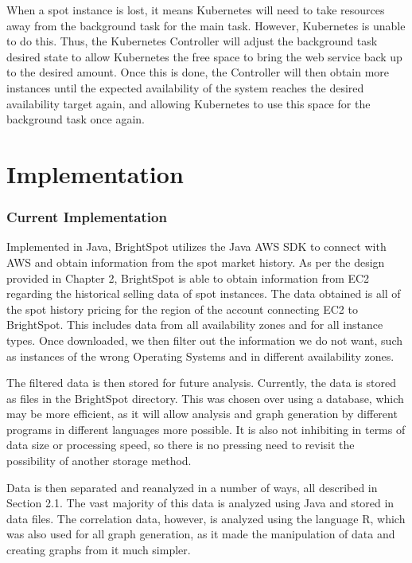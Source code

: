 \documentclass[thesis,proposal]{umassthesis}  %
\begin{document}
When a spot instance is lost, it means Kubernetes will need to take resources away from the background task for the main task. However, Kubernetes is unable to do this. Thus, the Kubernetes Controller will adjust the background task desired state to allow Kubernetes the free space to bring the web service back up to the desired amount. Once this is done, the Controller will then obtain more instances until the expected availability of the system reaches the desired availability target again, and allowing Kubernetes to use this space for the background task once again.








\chapter{Implementation}


\subsection{Current Implementation}
Implemented in Java, BrightSpot utilizes the Java AWS SDK to connect with AWS and obtain information from the spot market history. As per the design provided in Chapter 2, BrightSpot is able to obtain information from EC2 regarding the historical selling data of spot instances. The data obtained is all of the spot history pricing for the region of the account connecting EC2 to BrightSpot. This includes data from all availability zones and for all instance types. Once downloaded, we then filter out the information we do not want, such as instances of the wrong Operating Systems and in different availability zones.\par

The filtered data is then stored for future analysis. Currently, the data is stored as files in the BrightSpot directory. This was chosen over using a database, which may be more efficient, as it will allow analysis and graph generation by different programs in different languages more possible. It is also not inhibiting in terms of data size or processing speed, so there is no pressing need to revisit the possibility of another storage method.\par

Data is then separated and reanalyzed in a number of ways, all described in Section 2.1. The vast majority of this data is analyzed using Java and stored in data files. The correlation data, however, is analyzed using the language R, which was also used for all graph generation, as it made the manipulation of data and creating graphs from it much simpler.\par
\end{document}
